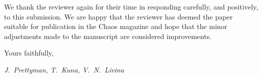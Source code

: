 \documentclass[12pt]{article}
\begin{document}
We thank the reviewer again for their time in responding carefully, and positively, to this submission. We are happy that the reviewer has deemed the paper suitable for publication in the Chaos magazine and hope that the minor adjustments made to the manuscript are considered improvements.

\vspace{5mm}

\noindent
Yours faithfully,

\vspace{1mm}

\noindent
\it J.~Prettyman, T.~Kuna, V.~N.~Livina
\end{document}
